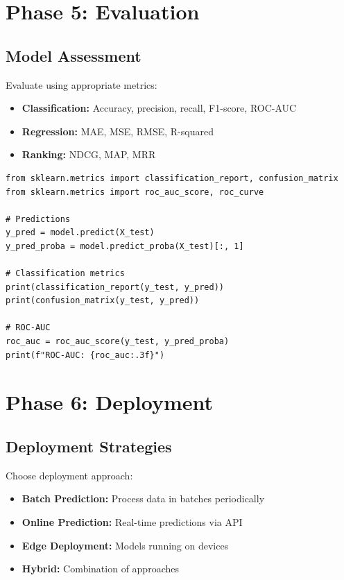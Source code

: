 \section{Phase 5: Evaluation}

\subsection{Model Assessment}

Evaluate using appropriate metrics:

\begin{itemize}
    \item \textbf{Classification:} Accuracy, precision, recall, F1-score, ROC-AUC
    \item \textbf{Regression:} MAE, MSE, RMSE, R-squared
    \item \textbf{Ranking:} NDCG, MAP, MRR
\end{itemize}

\begin{lstlisting}[style=python]
from sklearn.metrics import classification_report, confusion_matrix
from sklearn.metrics import roc_auc_score, roc_curve

# Predictions
y_pred = model.predict(X_test)
y_pred_proba = model.predict_proba(X_test)[:, 1]

# Classification metrics
print(classification_report(y_test, y_pred))
print(confusion_matrix(y_test, y_pred))

# ROC-AUC
roc_auc = roc_auc_score(y_test, y_pred_proba)
print(f"ROC-AUC: {roc_auc:.3f}")
\end{lstlisting}

\section{Phase 6: Deployment}

\subsection{Deployment Strategies}

Choose deployment approach:

\begin{itemize}
    \item \textbf{Batch Prediction:} Process data in batches periodically
    \item \textbf{Online Prediction:} Real-time predictions via API
    \item \textbf{Edge Deployment:} Models running on devices
    \item \textbf{Hybrid:} Combination of approaches
\end{itemize}

